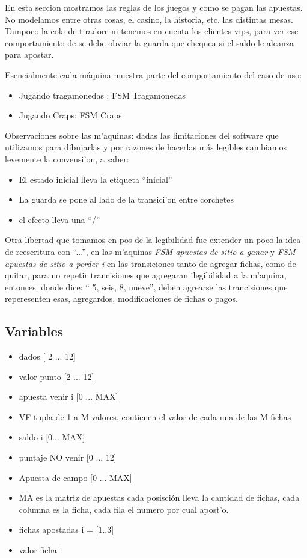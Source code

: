 
En esta seccion mostramos las reglas de los juegos y como se pagan las apuestas.
No modelamos entre otras cosas, el casino, la historia, etc. las distintas mesas.
Tampoco la cola de tiradore ni tenemos en cuenta los clientes vips, para ver ese
comportamiento de se debe obviar la guarda que chequea si el saldo le alcanza para apostar.

Esencialmente cada máquina muestra parte del comportamiento del caso de uso:
\begin{itemize}
 \item Jugando tragamonedas : FSM Tragamonedas
 \item Jugando Craps: FSM Craps
\end{itemize}

Observaciones sobre las m'aquinas:
dadas las limitaciones del software que utilizamos para dibujarlas y por razones 
de hacerlas más legibles cambiamos levemente la convensi'on, a saber:
\begin{itemize}
 \item El estado inicial lleva la etiqueta ``inicial''
\item La guarda se pone al lado de la transici'on entre corchetes
\item el efecto lleva una ``/''
\end{itemize}

Otra libertad que tomamos en pos de la legibilidad fue extender un poco 
la idea de reescritura con ``...'', en las m'aquinas \textit{FSM apuestas de sitio a ganar} y \textit{FSM apuestas de sitio a perder i} en las transiciones tanto de agregar fichas, como de quitar, para no repetir trancisiones que agregaran ilegibilidad a la m'aquina, entonces:
donde dice: `` 5, seis, 8, nueve'', deben agrearse las trancisiones que reperesenten esas, agregardos, modificaciones de 
fichas o pagos.



\subsection{Variables}

\begin{itemize}
\item dados [ 2 ... 12]
\item valor punto [2 ... 12]
\item apuesta venir i [0 ... MAX]
\item VF tupla de 1 a M valores, contienen el valor de cada una de las M fichas
\item saldo i [0... MAX]
\item puntaje NO venir [0 ... 12]
\item Apuesta de campo [0 ...  MAX]
\item MA es la matriz de apuestas cada posisción lleva la cantidad de fichas, cada columna es la ficha, cada fila el numero por cual apost'o.
\item fichas apostadas i = [1..3]
\item valor ficha i

\end{itemize}



